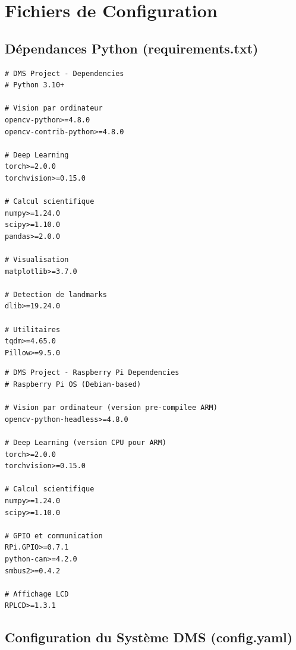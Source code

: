 
\chapter{Fichiers de Configuration}

\section{Dépendances Python (requirements.txt)}

\begin{lstlisting}[style=pythonstyle, caption={Fichier requirements.txt -- Dépendances PC.}, language={}]
# DMS Project - Dependencies
# Python 3.10+

# Vision par ordinateur
opencv-python>=4.8.0
opencv-contrib-python>=4.8.0

# Deep Learning
torch>=2.0.0
torchvision>=0.15.0

# Calcul scientifique
numpy>=1.24.0
scipy>=1.10.0
pandas>=2.0.0

# Visualisation
matplotlib>=3.7.0

# Detection de landmarks
dlib>=19.24.0

# Utilitaires
tqdm>=4.65.0
Pillow>=9.5.0
\end{lstlisting}

\begin{lstlisting}[style=pythonstyle, caption={Fichier requirements\_rpi.txt -- Dépendances Raspberry Pi.}, language={}]
# DMS Project - Raspberry Pi Dependencies
# Raspberry Pi OS (Debian-based)

# Vision par ordinateur (version pre-compilee ARM)
opencv-python-headless>=4.8.0

# Deep Learning (version CPU pour ARM)
torch>=2.0.0
torchvision>=0.15.0

# Calcul scientifique
numpy>=1.24.0
scipy>=1.10.0

# GPIO et communication
RPi.GPIO>=0.7.1
python-can>=4.2.0
smbus2>=0.4.2

# Affichage LCD
RPLCD>=1.3.1
\end{lstlisting}

\section{Configuration du Système DMS (config.yaml)}

